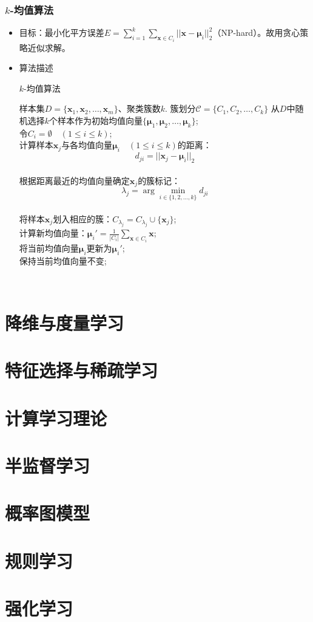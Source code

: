 \documentclass{ctexart}
\begin{document}
					\subsubsection{$k$-均值算法}
						\begin{itemize}
							\item 目标：最小化平方误差$E=\sum_{i=1}^{k}\sum_{\bm{x}\in C_i}^{}||\bm{x}-\bm{\mu}_i||_2^2$（NP-hard）。故用贪心策略近似求解。
							\item 算法描述\begin{algorithm}
								\caption{$k$-均值算法}
								\begin{algorithmic}[1]
									\REQUIRE 样本集$D=\{\bm{x}_1,\bm{x}_2,\dots,\bm{x}_m\}$、聚类簇数$k$.
									\ENSURE 簇划分$\mathcal{C}=\{C_1,C_2,\dots,C_k\}$
									\STATE 从$D$中随机选择$k$个样本作为初始均值向量$\{\bm{\mu}_1,\bm{\mu}_2,\dots,\bm{\mu}_k\}$; \\
									\REPEAT
									\STATE 令$C_i=\emptyset\quad(1\le i\le k)$; \\
										\STATE 计算样本$\bm{x}_j$与各均值向量$\bm{\mu}_i\quad(1\le i\le k)$的距离：\[d_{ji}=||\bm{x}_j-\bm{\mu}_i||_2\] \\
										\STATE 根据距离最近的均值向量确定$\bm{x}_j$的簇标记：\[\lambda_j=\arg\min_{i\in\{1,2,\dots,k\}}d_{ji}\] \\
										\STATE 将样本$\bm{x}_j$划入相应的簇：$C_{\lambda_j}=C_{\lambda_j}\cup\{\bm{x}_j\}$; \\
									\ENDFOR
										\STATE 计算新均值向量：$\bm{\mu}_i'=\frac{1}{|C_i|}\sum_{\bm{x}\in C_i}^{}\bm{x}$; \\
											\STATE 将当前均值向量$\bm{\mu}_i$更新为$\bm{\mu}_i'$; \\
										\ELSE
											\STATE 保持当前均值向量不变; \\
										\ENDIF
									\ENDFOR
								\end{algorithmic} 
							\end{algorithm}
						\end{itemize}
			\section{降维与度量学习}
			\section{特征选择与稀疏学习}
			\section{计算学习理论}
			\section{半监督学习}
			\section{概率图模型}
			\section{规则学习}
			\section{强化学习}
			
\end{document}
